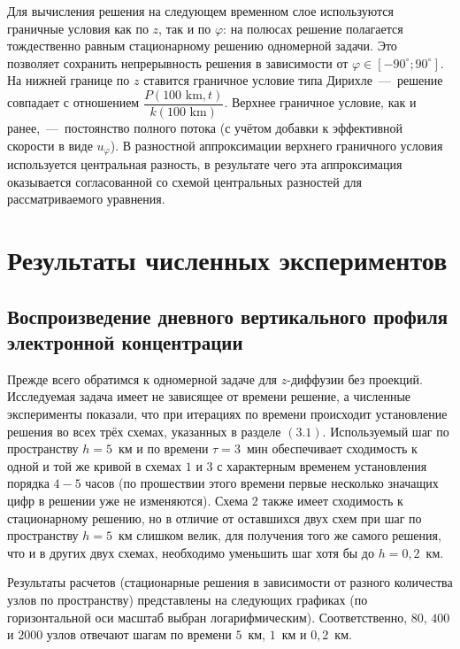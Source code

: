 \documentclass[14pt, a4paper, fleqn]{extarticle}
\begin{document}
Для вычисления решения на следующем временном слое используются граничные условия как по $z$, так и по $\varphi$: на полюсах решение полагается тождественно равным стационарному решению одномерной задачи. Это позволяет сохранить непрерывность решения в зависимости от $\varphi \in [-90^\circ; 90^\circ]$. На нижней границе по $z$ ставится граничное условие типа Дирихле~---~решение совпадает с отношением $\dfrac{P(100\mbox{ km}, t)}{k(100\mbox{ km})}$. Верхнее граничное условие, как и ранее,~---~постоянство полного потока (с учётом добавки к эффективной скорости в виде $u_\varphi$). В разностной аппроксимации верхнего граничного условия используется центральная разность, в результате чего эта аппроксимация оказывается согласованной со схемой центральных разностей для рассматриваемого уравнения.


\section{Результаты численных экспериментов}

\subsection{Воспроизведение дневного вертикального профиля электронной концентрации}

Прежде всего обратимся к одномерной задаче для $z$-диффузии без проекций. Исследуемая задача имеет не зависящее от времени решение, а численные эксперименты показали, что при итерациях по времени происходит установление решения во всех трёх схемах, указанных в разделе $(3.1)$. Используемый шаг по пространству $h = 5$~км и по времени $\tau = 3$~мин обеспечивает сходимость к одной и той же кривой в схемах $1$ и $3$ с характерным временем установления порядка $4-5$ часов (по прошествии этого времени первые несколько значащих цифр в решении уже не изменяются). Схема $2$ также имеет сходимость к стационарному решению, но в отличие от оставшихся двух схем при шаг по пространству $h=5$~км слишком велик, для получения того же самого решения, что и в других двух схемах, необходимо уменьшить шаг хотя бы до $h = 0{,}2$~км.

Результаты расчетов (стационарные решения в зависимости от разного количества узлов по пространству) представлены на следующих графиках (по горизонтальной оси масштаб выбран логарифмическим). Соответственно, $80$, $400$ и $2000$ узлов отвечают шагам по времени $5$~км, $1$~км и $0{,}2$~км.
 
\end{document}
